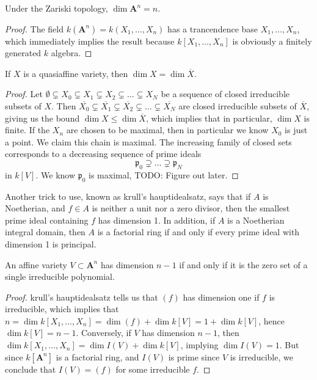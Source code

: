 \begin{theorem}
    Under the Zariski topology, $\dim \mathbf{A}^n = n$.
\end{theorem}
\begin{proof}
    The field $k(\mathbf{A}^n) = k(X_1, \dots, X_n)$ has a trancendence base $X_1, \dots, X_n$, which immediately implies the result because $k[X_1, \dots, X_n]$ is obviously a finitely generated $k$ algebra.
\end{proof}

\begin{theorem}
    If $X$ is a quasiaffine variety, then $\dim X = \dim \overline{X}$.
\end{theorem}
\begin{proof}
    Let $\emptyset \subsetneq X_0 \subsetneq X_1 \subsetneq X_2 \subsetneq \dots \subsetneq X_N$ be a sequence of closed irreducible subsets of $X$. Then $\overline{X_0} \subsetneq \overline{X_1} \subsetneq \overline{X_2} \subsetneq \dots \subsetneq \overline{X_N}$ are closed irreducible subsets of $\overline{X}$, giving us the bound $\dim X \leq \dim \overline{X}$, which implies that in particular, $\dim X$ is finite. If the $X_n$ are chosen to be maximal, then in particular we know $X_0$ is just a point. We claim this chain is maximal. The increasing family of closed sets corresponds to a decreasing sequence of prime ideals
    \[ \mathfrak{p}_0 \supsetneq \dots \supsetneq \mathfrak{p}_N \]
    in $k[V]$. We know $\mathfrak{p}_0$ is maximal, TODO: Figure out later.
\end{proof}

Another trick to use, known as krull's hauptidealsatz, says that if $A$ is Noetherian, and $f \in A$ is neither a unit nor a zero divisor, then the smallest prime ideal containing $f$ has dimension 1. In addition, if $A$ is a Noetherian integral domain, then $A$ is a factorial ring if and only if every prime ideal with dimension 1 is principal.

\begin{theorem}
    An affine variety $V \subset \mathbf{A}^n$ has dimension $n-1$ if and only if it is the zero set of a single irreducible polynomial.
\end{theorem}
\begin{proof}
    krull's hauptidealsatz tells us that $(f)$ has dimension one if $f$ is irreducible, which implies that $n = \dim k[X_1,\dots,X_n] = \dim (f) + \dim k[V] = 1 + \dim k[V]$, hence $\dim k[V] = n-1$. Conversely, if $V$ has dimension $n-1$, then $\dim k[X_1,\dots,X_n] = \dim I(V) + \dim k[V]$, implying $\dim I(V) = 1$. But since $k[\mathbf{A}^n]$ is a factorial ring, and $I(V)$ is prime since $V$ is irreducible, we conclude that $I(V) = (f)$ for some irreducible $f$.
\end{proof}

